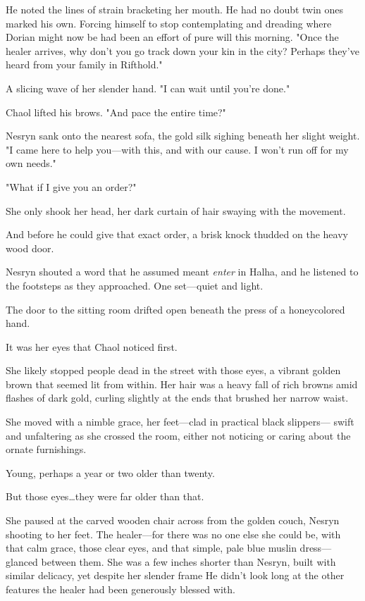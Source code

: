 He noted the lines of strain bracketing her mouth. He had no doubt twin ones marked his own. Forcing himself to stop contemplating and dreading where Dorian might now be had been an effort of pure will this morning. "Once the healer arrives, why don't you go track down your kin in the city? Perhaps they've heard from your family in Rifthold."

A slicing wave of her slender hand. "I can wait until you're done."

Chaol lifted his brows. "And pace the entire time?"

Nesryn sank onto the nearest sofa, the gold silk sighing beneath her slight weight. "I came here to help you---with this, and with our cause. I won't run off for my own needs."

"What if I give you an order?"

She only shook her head, her dark curtain of hair swaying with the movement.

And before he could give that exact order, a brisk knock thudded on the heavy wood door.

Nesryn shouted a word that he assumed meant \emph{enter} in Halha, and he listened to the footsteps as they approached. One set---quiet and light.

The door to the sitting room drifted open beneath the press of a honeycolored hand.

It was her eyes that Chaol noticed first.

She likely stopped people dead in the street with those eyes, a vibrant golden brown that seemed lit from within. Her hair was a heavy fall of rich browns amid flashes of dark gold, curling slightly at the ends that brushed her narrow waist.

She moved with a nimble grace, her feet---clad in practical black slippers--- swift and unfaltering as she crossed the room, either not noticing or caring about the ornate furnishings.

Young, perhaps a year or two older than twenty.

But those eyes\ldots they were far older than that.

She paused at the carved wooden chair across from the golden couch, Nesryn shooting to her feet. The healer---for there was no one else she could be, with that calm grace, those clear eyes, and that simple, pale blue muslin dress--- glanced between them. She was a few inches shorter than Nesryn, built with similar delicacy, yet despite her slender frame He didn't look long at the other features the healer had been generously blessed with.

